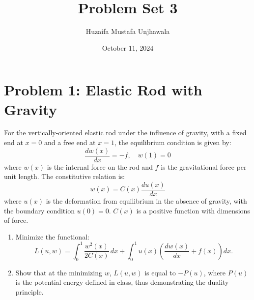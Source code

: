 \documentclass{article}
\title{Problem Set 3}
\author{Huzaifa Mustafa Unjhawala}
\date{October 11, 2024}
\begin{document}
\maketitle

\section*{Problem 1: Elastic Rod with Gravity}

For the vertically-oriented elastic rod under the influence of gravity, with a fixed end at $x = 0$ and a free end at $x = 1$, the equilibrium condition is given by:
\[
\frac{dw(x)}{dx} = -f, \quad w(1) = 0
\]
where $w(x)$ is the internal force on the rod and $f$ is the gravitational force per unit length. The constitutive relation is:
\[
w(x) = C(x) \frac{du(x)}{dx}
\]
where $u(x)$ is the deformation from equilibrium in the absence of gravity, with the boundary condition $u(0) = 0$. $C(x)$ is a positive function with dimensions of force.

\begin{enumerate}[label=(\alph*)]
    \item Minimize the functional:
    \[
    L(u, w) = \int_0^1 \frac{w^2(x)}{2C(x)} \, dx + \int_0^1 u(x) \left( \frac{dw(x)}{dx} + f(x) \right) dx.
    \]
    
    \item Show that at the minimizing $w$, $L(u, w)$ is equal to $-P(u)$, where $P(u)$ is the potential energy defined in class, thus demonstrating the duality principle.
\end{enumerate}
\end{document}

